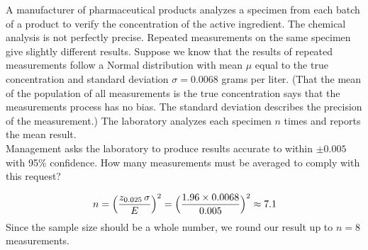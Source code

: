 

\begin{example}
\label{exSampleSizePharmaceutical}

A manufacturer of pharmaceutical products analyzes a specimen from each batch of a product to verify the concentration of the active ingredient. The chemical analysis is not perfectly precise. Repeated measurements on the same specimen give slightly different results. Suppose we know that the results of repeated measurements follow a Normal distribution with mean \(\mu\) equal to the true concentration and standard deviation \(\sigma = 0.0068\) grams per liter. (That the mean of the population of all measurements is the true concentration says that the measurements process has no bias. The standard deviation describes the precision of the measurement.) The laboratory analyzes each specimen \(n\) times and reports the mean result.\\

Management asks the laboratory to produce results accurate to within \(\pm 0.005\) with 95\% confidence. How many measurements must be averaged to comply with this request?


\[
n = \left( \displaystyle \frac{z_{0.025}\,\sigma}{E} \right)^2
    = \Bigl(\frac{1.96 \times 0.0068}{0.005}\Bigr)^2
    \approx 7.1
\]
Since the sample size should be a whole number, we round our result up to \(n=8\) measurements.
\end{example}

